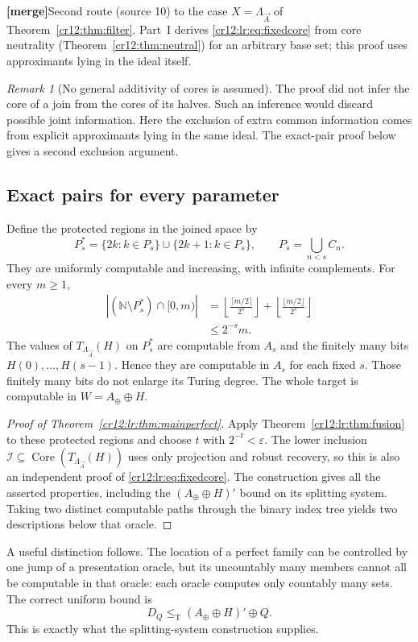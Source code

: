 \documentclass[11pt,letterpaper]{article}
\theoremstyle{plain}
\theoremstyle{definition}
\theoremstyle{remark}
\newtheorem{remark}[theorem]{Remark}
\numberwithin{equation}{section}
\newcommand{\N}{\mathbb N}
\newcommand{\leT}{\leq_{\mathrm T}}
\newcommand{\Core}{\operatorname{Core}}
\newcommand{\I}{\mathcal I}
\newcommand{\mergenote}[1]{\par\smallskip\noindent
 {\small\textsf{\textbf{[merge]}}\enspace #1}\par\smallskip}
\newcommand{\Aplus}{A_{\oplus}}          %
\newcommand{\Lam}{\Lambda_{\vec A}}      %
\begin{document}
\mergenote{Second route (source 10) to the case $X=\Lam$ of
Theorem~\ref{cr12:thm:filter}. Part~I derives \eqref{cr12:lr:eq:fixedcore} from core
neutrality (Theorem~\ref{cr12:thm:neutral}) for an arbitrary base set; this proof uses
approximants lying in the ideal itself.}

\begin{remark}[No general additivity of cores is assumed]
The proof did not infer the core of a join from the cores of its halves. Such an
inference would discard possible joint information. Here the exclusion of extra
common information comes from explicit approximants lying in the same ideal. The
exact-pair proof below gives a second exclusion argument.
\end{remark}

\subsection{Exact pairs for every parameter}
Define the protected regions in the joined space by
\[
 P_s^*=\{2k:k\in P_s\}\cup\{2k+1:k\in P_s\},
 \qquad P_s=\bigcup_{n<s}C_n.
\]
They are uniformly computable and increasing, with infinite complements. For every
$m\geq1$,
\begin{align*}
 |(\N\setminus P_s^*)\cap[0,m)|
 &=\left\lfloor\frac{\lceil m/2\rceil}{2^s}\right\rfloor
   +\left\lfloor\frac{\lfloor m/2\rfloor}{2^s}\right\rfloor\\
 &\leq 2^{-s}m.
\end{align*}
The values of $T_{\Lam}(H)$ on $P_s^*$ are computable from $A_s$ and the finitely many
bits $H(0),\ldots,H(s-1)$. Hence they are computable in $A_s$ for each fixed $s$. Those
finitely many bits do not enlarge its Turing degree. The whole target is computable in
$W=\Aplus\oplus H$.

\begin{proof}[Proof of Theorem~\ref{cr12:lr:thm:mainperfect}]
Apply Theorem~\ref{cr12:lr:thm:fusion} to these protected regions and choose $t$ with
$2^{-t}<\varepsilon$. The lower inclusion $\I\subseteq\Core(T_{\Lam}(H))$ uses only
projection and robust recovery, so this is also an independent proof of
\eqref{cr12:lr:eq:fixedcore}. The construction gives all the asserted properties,
including the $(\Aplus\oplus H)'$ bound on its splitting system. Taking two distinct
computable paths through the binary index tree yields two descriptions below that
oracle.
\end{proof}

A useful distinction follows. The location of a perfect family can be controlled by
one jump of a presentation oracle, but its uncountably many members cannot all be
computable in that oracle: each oracle computes only countably many sets. The correct
uniform bound is
\begin{equation}\label{cr12:lr:eq:pathbound}
 D_Q\leT (\Aplus\oplus H)'\oplus Q.
\end{equation}
This is exactly what the splitting-system construction supplies.
\end{document}

